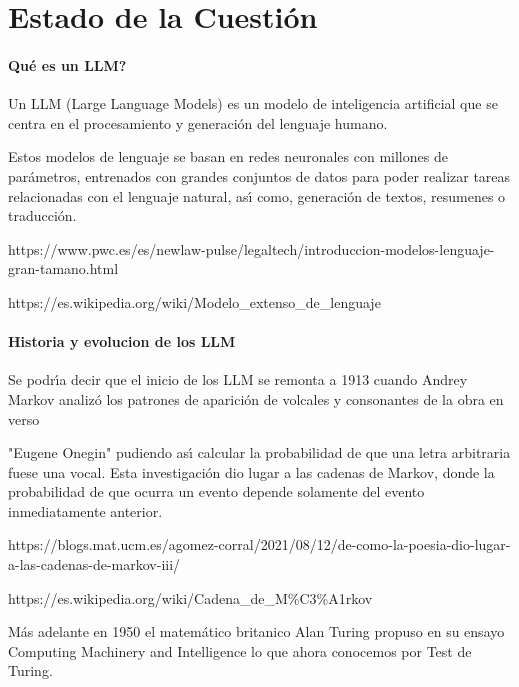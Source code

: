 

\chapter{Estado de la Cuesti\'{o}n}

\label{cap:estadoDeLaCuestion}

\bigskip

\subsubsection{\textquestiondown Qu\'{e} es un LLM?}

Un LLM (Large Language Models) es un modelo de inteligencia artificial que se
centra en el procesamiento y generaci\'{o}n del lenguaje humano.

Estos modelos de lenguaje se basan en redes neuronales con millones de
par\'{a}metros, entrenados con grandes conjuntos de datos para poder realizar
tareas relacionadas con el lenguaje natural, as\'{\i} como, generaci\'{o}n de
textos, resumenes o traducci\'{o}n.

https://www.pwc.es/es/newlaw-pulse/legaltech/introduccion-modelos-lenguaje-gran-tamano.html

https://es.wikipedia.org/wiki/Modelo\_extenso\_de\_lenguaje

\subsubsection{Historia y evolucion de los LLM}

Se podr\'{\i}a decir que el inicio de los LLM se remonta a 1913 cuando Andrey
Markov analiz\'{o} los patrones de aparici\'{o}n de volcales y consonantes de
la obra en verso

"Eugene Onegin" pudiendo as\'{\i} calcular la probabilidad de que una letra
arbitraria fuese una vocal. Esta investigaci\'{o}n dio lugar a las cadenas de
Markov, donde la probabilidad de que ocurra un evento depende solamente del
evento inmediatamente anterior.

https://blogs.mat.ucm.es/agomez-corral/2021/08/12/de-como-la-poesia-dio-lugar-a-las-cadenas-de-markov-iii/

https://es.wikipedia.org/wiki/Cadena\_de\_M\%C3\%A1rkov

\bigskip

M\'{a}s adelante en 1950 el matem\'{a}tico britanico Alan Turing propuso en su
ensayo Computing Machinery and Intelligence lo que ahora conocemos por Test de Turing.


